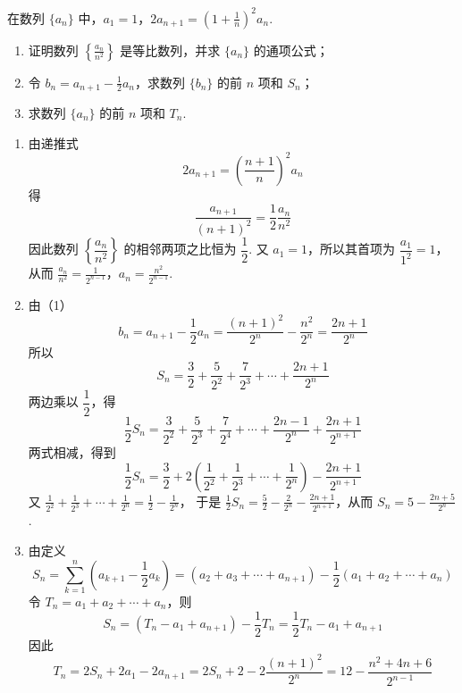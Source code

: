 \begin{problem}
在数列 \(\{a_n\}\) 中，\(a_1=1\)，\(2a_{n+1}=\left(1+\frac{1}{n}\right)^2 a_n\).

\begin{enumerate}
\item 证明数列 \(\left\{\frac{a_n}{n^2}\right\}\) 是等比数列，并求 \(\{a_n\}\) 的通项公式；

\item 令 \(b_n=a_{n+1}-\frac{1}{2}a_n\)，求数列 \(\{b_n\}\) 的前 \(n\) 项和 \(S_n\)；

\item 求数列 \(\{a_n\}\) 的前 \(n\) 项和 \(T_n\).
\end{enumerate}
\end{problem}

\begin{solution}
\begin{enumerate}
\item 由递推式
\[
2a_{n+1}=\left(\frac{n+1}{n}\right)^2a_n
\]
得
\[
\frac{a_{n+1}}{(n+1)^2}=\frac12\frac{a_n}{n^2}
\]
因此数列 \(\left\{\dfrac{a_n}{n^2}\right\}\) 的相邻两项之比恒为 \(\dfrac12\). 又 \(a_1=1\)，所以其首项为 \(\dfrac{a_1}{1^2}=1\)，从而 \(\frac{a_n}{n^2}=\frac{1}{2^{n-1}}\)，\(a_n=\frac{n^2}{2^{n-1}}\).

\item 由（1）
\[
b_n=a_{n+1}-\frac12a_n=\frac{(n+1)^2}{2^n}-\frac{n^2}{2^n}=\frac{2n+1}{2^n}
\]
所以
\[
S_n=\frac32+\frac5{2^2}+\frac7{2^3}+\cdots+\frac{2n+1}{2^n}
\]
两边乘以 \(\dfrac12\)，得
\[
\frac12S_n=\frac3{2^2}+\frac5{2^3}+\frac7{2^4}+\cdots+\frac{2n-1}{2^n}+\frac{2n+1}{2^{n+1}}
\]
两式相减，得到
\[
\frac12S_n=\frac32+2\left(\frac1{2^2}+\frac1{2^3}+\cdots+\frac1{2^n}\right)-\frac{2n+1}{2^{n+1}}
\]
又 \(\displaystyle\frac1{2^2}+\frac1{2^3}+\cdots+\frac1{2^n}=\frac12-\frac1{2^n}\)，
于是 \(\frac12S_n=\frac52-\frac{2}{2^n}-\frac{2n+1}{2^{n+1}}\)，从而 \(S_n=5-\frac{2n+5}{2^n}\).

\item 由定义
\[
S_n=\sum_{k=1}^n\left(a_{k+1}-\frac12a_k\right)=\left(a_2+a_3+\cdots+a_{n+1}\right)-\frac12\left(a_1+a_2+\cdots+a_n\right)
\]
令 \(T_n=a_1+a_2+\cdots+a_n\)，则
\[
S_n=(T_n-a_1+a_{n+1})-\frac12T_n=\frac12T_n-a_1+a_{n+1}
\]
因此
\[
T_n=2S_n+2a_1-2a_{n+1}=2S_n+2-2\frac{(n+1)^2}{2^n}=12-\frac{n^2+4n+6}{2^{n-1}}
\]
\end{enumerate}
\end{solution}

